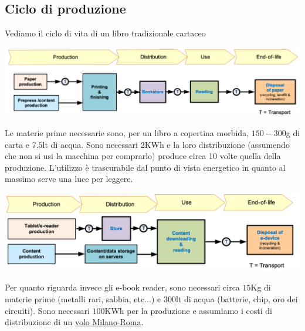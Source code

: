 \subsection{Ciclo di produzione}
Vediamo il ciclo di vita di un libro tradizionale cartaceo
\begin{center}
	\includegraphics[scale=0.3]{books_lifecycle.png}
\end{center}
Le materie prime necessarie sono, per un libro a copertina morbida, $150-300$g di carta e $7.5$lt di acqua. Sono necessari $2$KWh  e la loro distribuzione (assumendo che non si usi la macchina per comprarlo) produce circa 10 volte quella della produzione. L'utilizzo è trascurabile dal punto di vista energetico in quanto al massimo serve una luce per leggere.
\begin{center}
	\includegraphics[scale=0.3]{ereader_lifecycle.png}
\end{center}
Per quanto riguarda invece gli e-book reader, sono necessari circa $15$Kg di materie prime (metalli rari, sabbia, etc...) e $300$lt di acqua (batterie, chip, oro dei circuiti). Sono necessari $100$KWh per la produzione e assumiamo i costi di distribuzione di un  \href{https://www.icao.int/environmental-protection/Carbonoffset/Pages/default.aspx}{\color{blue}volo Milano-Roma}.

